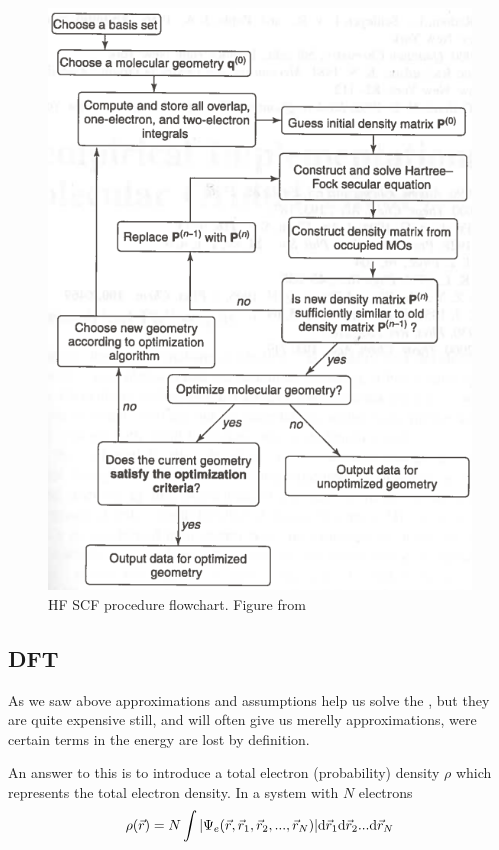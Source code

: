 \documentclass[../master_thesis.tex]{subfiles}
\begin{document}
\begin{figure}[ht]
  \includegraphics[width=\linewidth]{img/SCF.png}
  \caption{HF SCF procedure flowchart. Figure from \cite{Cramer:2004}}
  \label{fig:SCF}
\end{figure}

\subsection{\ac{DFT}}
As we saw above approximations and assumptions help us solve the \SE, but they
are quite expensive still, and will often give us merelly approximations, were
certain terms in the energy are lost by definition.

An answer to this is to introduce a total electron (probability) density $\rho$ which
represents the total electron density. In a system with $N$ electrons \cite{Sorland, Cramer:2004, }
\begin{equation}
  \rho(\vec{r}) = N \int\abs{\Psi_e(\vec{r}, \vec{r}_1, \vec{r}_2,..., \vec{r}_N)} \text{d}\vec{r}_1\text{d}\vec{r}_2...\text{d}\vec{r}_N
\end{equation}




\biblio
\end{document}
